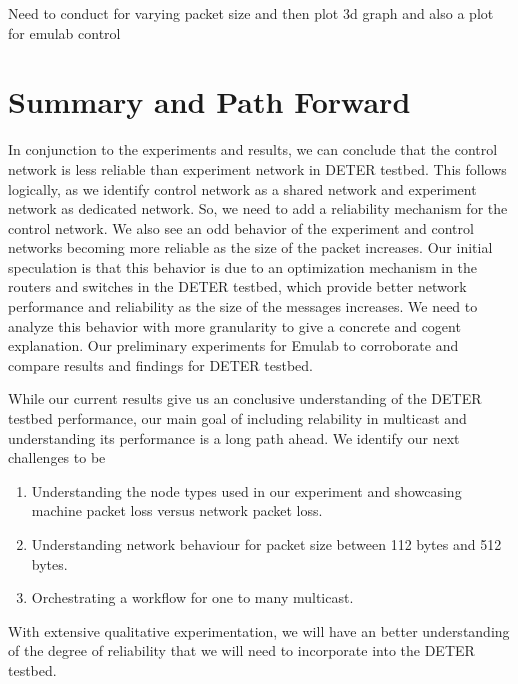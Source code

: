 \documentclass[11pt]{article}
\begin{document}
\FloatBarrier
{Need to conduct for varying packet size and then plot 3d graph and also a plot for emulab control}

\section{Summary and Path Forward}
\label{sec:summary}
In conjunction to the experiments and results, we can conclude that the control network is less reliable than experiment network in DETER testbed. This follows logically, as we identify control network as a shared network and experiment network as dedicated network. So, we need to add a reliability mechanism for the control network. We also see an odd behavior of the experiment and control networks becoming more reliable as the size of the packet increases. Our initial speculation is that this behavior is due to an optimization mechanism in the routers and switches in the DETER testbed, which provide better network performance and reliability as the size of the messages increases. We need to analyze this behavior with more granularity to give a concrete and cogent explanation. Our preliminary experiments for Emulab to corroborate and compare results and findings for DETER testbed.

While our current results give us an conclusive understanding of the DETER testbed performance, our main goal of including relability in multicast and understanding its performance is a long path ahead. We identify our next challenges to be
\begin{enumerate}
\item Understanding the node types used in our experiment and showcasing machine packet loss versus network packet loss.
\item Understanding network behaviour for packet s​ize between 112 bytes and 512 bytes.
\item Orchestrating a workflow for one to many multicast.
\end{enumerate}
With extensive qualitative experimentation, we will have an better understanding of the degree of reliability that we will need to incorporate into the DETER testbed.





\end{document}
